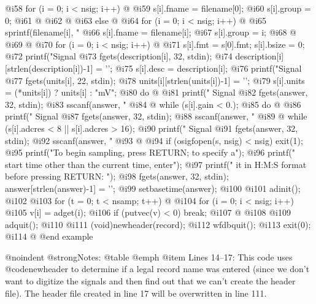 {{{{{{{{{{{{ @i{58}          for (i = 0; i < nsig; i++) @{
 @i{59}               s[i].fname = filename[0];
 @i{60}               s[i].group = 0;
 @i{61}          @}
 @i{62}      @}
 @i{63}      else @{
 @i{64}          for (i = 0; i < nsig; i++) @{
 @i{65}               sprintf(filename[i], "%
 @i{66}               s[i].fname = filename[i];
 @i{67}               s[i].group = i;
 @i{68}          @}
 @i{69}      @}
 @i{70}      for (i = 0; i < nsig; i++) @{
 @i{71}          s[i].fmt = s[0].fmt; s[i].bsize = 0;
 @i{72}          printf("Signal %
 @i{73}          fgets(description[i], 32, stdin);
 @i{74}          description[i][strlen(description[i])-1] = '\0';
 @i{75}          s[i].desc = description[i];
 @i{76}          printf("Signal %
 @i{77}          fgets(units[i], 22, stdin);
 @i{78}          units[i][strlen(units[i])-1] = '\0';
 @i{79}          s[i].units = (*units[i]) ? units[i] : "mV";
 @i{80}          do @{
 @i{81}              printf(" Signal %
 @i{82}              fgets(answer, 32, stdin);
 @i{83}              sscanf(answer, "%
 @i{84}          @} while (s[i].gain < 0.);
 @i{85}          do @{
 @i{86}              printf(" Signal %
 @i{87}              fgets(answer, 32, stdin);
 @i{88}              sscanf(answer, "%
 @i{89}          @} while (s[i].adcres < 8 || s[i].adcres > 16);
 @i{90}          printf(" Signal %
 @i{91}          fgets(answer, 32, stdin);
 @i{92}          sscanf(answer, "%
 @i{93}      @}
 @i{94}      if (osigfopen(s, nsig) < nsig) exit(1);
 @i{95}      printf("To begin sampling, press RETURN;  to specify a\n");
 @i{96}      printf(" start time other than the current time, enter\n");
 @i{97}      printf(" it in H:M:S format before pressing RETURN: ");
 @i{98}      fgets(answer, 32, stdin); answer[strlen(answer)-1] = '\0';
 @i{99}      setbasetime(answer);
@i{100}  
@i{101}      adinit();
@i{102}  
@i{103}      for (t = 0; t < nsamp; t++) @{
@i{104}          for (i = 0; i < nsig; i++)
@i{105}              v[i] = adget(i);
@i{106}          if (putvec(v) < 0) break;
@i{107}      @}
@i{108}  
@i{109}      adquit();
@i{110}  
@i{111}      (void)newheader(record);
@i{112}      wfdbquit();
@i{113}      exit(0);
@i{114}  @}
@end example

@noindent
@strong{Notes:}
@table @emph
@item Lines 14--17:
This code uses @code{newheader} to determine if a legal record name was
entered (since we don't want to digitize the signals and then find out
that we can't create the header file).  The header file
created in line 17 will be overwritten in line 111.

}}}}}}}}}}
